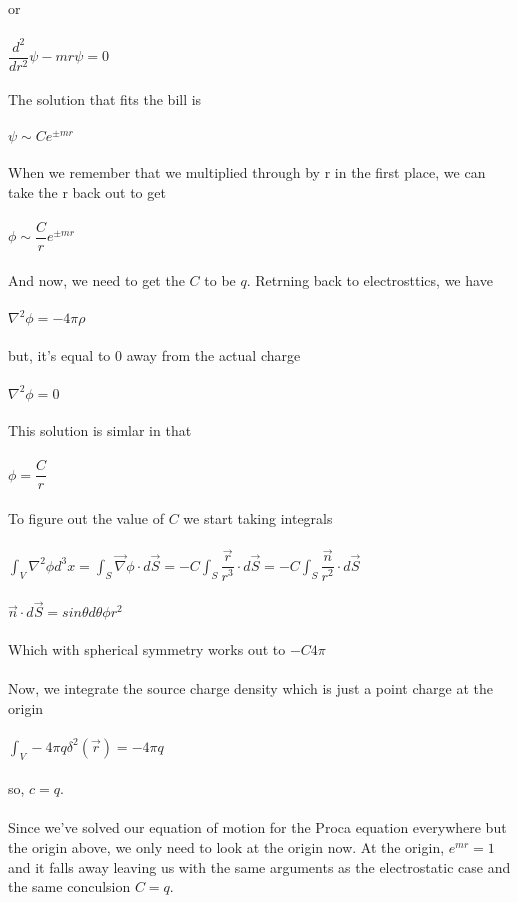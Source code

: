 \documentclass[prb,preprint]
{revtex4-1}
\begin{document}
or
\\
\\
$\dfrac{d^2}{d r^2}\psi- mr\psi = 0$
\\
\\
The solution that fits the bill is 
\\
\\
$\psi \sim Ce^{\pm mr}$
\\
\\
When we remember that we multiplied through by r in the first place, we can take the r back out to get 
\\
\\
$\phi \sim \dfrac{C}{r}e^{\pm mr}$
\\
\\
And now, we need to get the $C$ to be $q$.  Retrning back to electrosttics, we have
\\
\\
$\nabla^2\phi = -4\pi\rho$
\\
\\
but, it's equal to 0 away from the actual charge
\\
\\
$\nabla^2\phi = 0$
\\
\\
This solution is simlar in that 
\\
\\
$\phi = \dfrac{C}{r}$
\\
\\
To figure out the value of $C$ we start taking integrals
\\
\\
$\int_V \nabla^2 \phi d^3x = \int_S \vec{\nabla}\phi\cdot d\vec{S} = -C\int_S \dfrac{\vec{r}}{r^3}\cdot d\vec{S} = -C\int_S \dfrac{\vec{n}}{r^2}\cdot d\vec{S}$
\\
\\
$\vec{n}\cdot d\vec{S} = sin\theta d\theta\phi r^2$
\\
\\
Which with spherical symmetry works out to $-C4\pi$
\\
\\
Now, we integrate the source charge density which is just a point charge at the origin
\\
\\
$\int_V -4\pi q \delta^2\left(\vec{r}\right) = -4\pi q$
\\
\\
so, $c = q$.
\\
\\
Since we've solved our equation of motion for the Proca equation everywhere but the origin above, we only need to look at the origin now.  At the origin, $e^{mr} = 1$ and it falls away leaving us with the same arguments as the electrostatic case and the same conculsion $C = q$.
\end{document}

